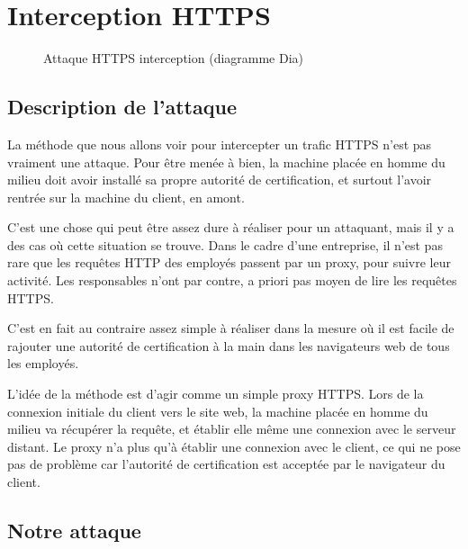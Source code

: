 \chapter{Interception HTTPS}

\label{sec:https-interception}

\begin{figure}[H]
  \caption{Attaque HTTPS interception (diagramme Dia)}
\end{figure}

\section{Description de l'attaque}

La méthode que nous allons voir pour intercepter un trafic HTTPS n'est pas vraiment une attaque. Pour être menée à bien, la machine placée en homme du milieu doit avoir installé sa propre autorité de certification, et surtout l'avoir rentrée sur la machine du client, en amont.

C'est une chose qui peut être assez dure à réaliser pour un attaquant, mais il y a des cas où cette situation se trouve. Dans le cadre d'une entreprise, il n'est pas rare que les requêtes HTTP des employés passent par un proxy, pour suivre leur activité. Les responsables n'ont par contre, a priori pas moyen de lire les requêtes HTTPS.

C'est en fait au contraire assez simple à réaliser dans la mesure où il est facile de rajouter une autorité de certification à la main dans les navigateurs web de tous les employés.

L'idée de la méthode est d'agir comme un simple proxy HTTPS. Lors de la connexion initiale du client vers le site web, la machine placée en homme du milieu va récupérer la requête, et établir elle même une connexion avec le serveur distant. Le proxy n'a plus qu'à établir une connexion avec le client, ce qui ne pose pas de problème car l'autorité de certification est acceptée par le navigateur du client.

\section{Notre attaque}

